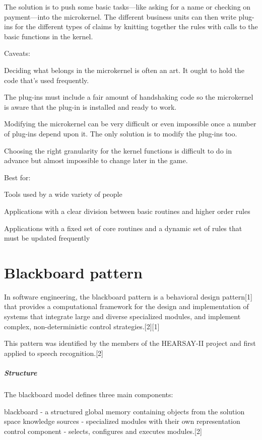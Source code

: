 \documentclass{book}
\begin{document}
The solution is to push some basic tasks—like asking for a name or checking on payment—into the microkernel.
The different business units can then write plug-ins for the different types of claims by knitting together the rules with calls to the basic functions in the kernel.

Caveats:

    Deciding what belongs in the microkernel is often an art. It ought to hold the code that’s used frequently.

    The plug-ins must include a fair amount of handshaking code so the microkernel is aware that the plug-in is installed and ready to work.

    Modifying the microkernel can be very difficult or even impossible once a number of plug-ins depend upon it. The only solution is to modify the plug-ins too.

    Choosing the right granularity for the kernel functions is difficult to do in advance but almost impossible to change later in the game.

Best for:

    Tools used by a wide variety of people

    Applications with a clear division between basic routines and higher order rules

    Applications with a fixed set of core routines and a dynamic set of rules that must be updated frequently
\chapter{Blackboard pattern}
In software engineering, the blackboard pattern is a behavioral design pattern[1] that provides a computational framework for the design and implementation of systems
that integrate large and diverse specialized modules, and implement complex, non-deterministic control strategies.[2][1]

This pattern was identified by the members of the HEARSAY-II project and first applied to speech recognition.[2]

\paragraph{Structure}

The blackboard model defines three main components:

    blackboard - a structured global memory containing objects from the solution space
    knowledge sources - specialized modules with their own representation
    control component - selects, configures and executes modules.[2]
\end{document}
